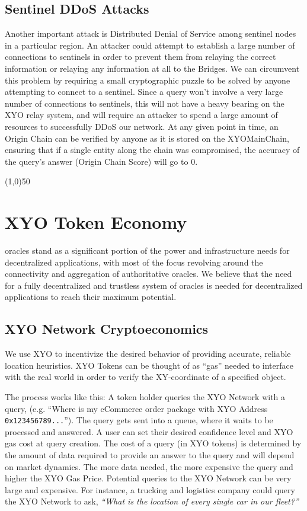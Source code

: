 \documentclass{article}
\begin{document}
\subsection{Sentinel DDoS Attacks}

Another important attack is Distributed Denial of Service among sentinel nodes in a particular region. An attacker could attempt to establish a large number of connections to sentinels in order to prevent them from relaying the correct information or relaying any information at all to the Bridges. We can circumvent this problem by requiring a small cryptographic puzzle to be solved by anyone attempting to connect to a sentinel. Since a query won't involve a very large number of connections to sentinels, this will not have a heavy bearing on the XYO relay system, and will require an attacker to spend a large amount of resources to successfully DDoS our network. At any given point in time, an Origin Chain can be verified by anyone as it is stored on the XYOMainChain, ensuring that if a single entity along the chain was compromised, the accuracy of the query's answer (Origin Chain Score) will go to 0.

\begin{center}
\line(1,0){50}
\end{center}

\section {XYO Token Economy}

\Glspl{oracle} stand as a significant portion of the power and infrastructure needs for decentralized applications, with most of the focus revolving around the connectivity and aggregation of authoritative oracles. We believe that the need for a fully decentralized and trustless system of oracles is needed for decentralized applications to reach their maximum potential.


\subsection {XYO Network Cryptoeconomics}
 We use XYO to incentivize the desired behavior of providing accurate, reliable location \glspl{heuristic}. XYO Tokens can be thought of as ``gas'' needed to interface with the real world in order to verify the XY-coordinate of a specified object.

The process works like this: A token holder queries the XYO Network with a query, (e.g. ``Where is my eCommerce order package with XYO Address \texttt{0x123456789...}''). The query gets sent into a queue, where it waits to be processed and answered. A user can set their desired confidence level and XYO gas cost at query creation. The cost of a query (in XYO tokens) is determined by the amount of data required to provide an answer to the query and will depend on market dynamics.  The more data needed, the more expensive the query and higher the XYO Gas Price. Potential queries to the XYO Network can be very large and expensive. For instance, a trucking and logistics company could query the XYO Network to ask, \textit{``What is the location of every single car in our fleet?''}
\end{document}
